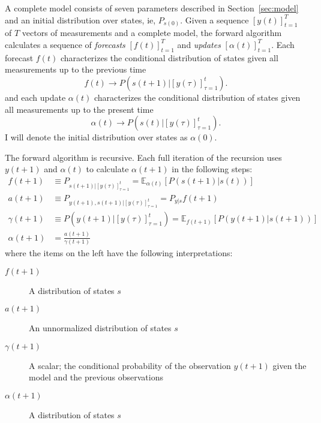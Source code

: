 \documentclass[12pt]{article}
\newcommand{\field}[1]{\mathbb{#1}}
\newcommand{\EV}[2]{\field{E}_{#1}\left[#2\right]}
\newcommand{\os}[4]{{\left[ #1(#2) \right]}_{#3}^{#4}} %
\newcommand{\ti}[2]{{#1}{(#2)}}                         %
\begin{document}
A complete model consists of seven parameters described in
Section~\ref{sec:model} and an initial distribution over states, ie,
$P_{s(0)}$.  Given a sequence $\os{y}{t}{t=1}{T}$ of $T$ vectors of
measurements and a complete model, the forward algorithm calculates a
sequence of \emph{forecasts} $\os{f}{t}{t=1}{T}$ and \emph{updates}
$\os{\alpha}{t}{t=1}{T}$.  Each forecast $\ti{f}{t}$ characterizes the
conditional distribution of states given all measurements up to the
previous time
\begin{equation*}
  \ti{f}{t} \rightarrow P(\ti{s}{t+1}|\os{y}{\tau}{\tau=1}{t}).
\end{equation*}
and each update $\ti{\alpha}{t}$ characterizes the conditional
distribution of states given all measurements up to the present time
\begin{equation*}
  \ti{\alpha}{t} \rightarrow P(\ti{s}{t}|\os{y}{\tau}{\tau=1}{t}).
\end{equation*}
I will denote the initial distribution over states as
$\ti{\alpha}{0}$.

The forward algorithm is recursive.  Each full iteration of the
recursion uses $\ti{y}{t+1}$ and $\ti{\alpha}{t}$ to calculate
$\ti{\alpha}{t+1}$ in the following steps:
\begin{subequations}
  \label{eq:Forward}
\begin{align}
  \label{eq:f1}
  \ti{f}{t+1} &\equiv P_{\ti{s}{t+1}|\os{y}{\tau}{\tau=1}{t}} =
  \EV{\ti{\alpha}{t}}{P(\ti{s}{t+1}|\ti{s}{t})} \\ 
  \label{eq:f2}
  \ti{a}{t+1} &\equiv
  P_{\ti{y}{t+1},\ti{s}{t+1}|\os{y}{\tau}{\tau=1}{t}} = P_{y|s}
  \ti{f}{t+1} \\
  \label{eq:f3}
  \ti{\gamma}{t+1} &\equiv P(\ti{y}{t+1}|\os{y}{\tau}{\tau=1}{t}) = \EV{\ti{f}{t+1}}{P(\ti{y}{t+1}|\ti{s}{t+1})} \\
  \label{eq:f4}
  \ti{\alpha}{t+1} &= \frac{\ti{a}{t+1}}{\ti{\gamma}{t+1}}
\end{align}
\end{subequations}
where the items on the left have the following interpretations:
\begin{description}
\item[$\ti{f}{t+1}$] A distribution of states $s$
\item[$\ti{a}{t+1}$] An unnormalized distribution of states $s$
\item[$\ti{\gamma}{t+1}$] A scalar; the conditional probability of the
  observation $\ti{y}{t+1}$ given the model and the previous observations
\item[$\ti{\alpha}{t+1}$] A distribution of states $s$
\end{description}
\end{document}
